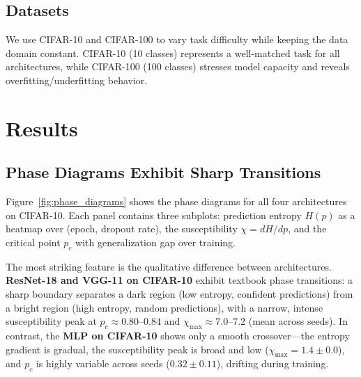 \documentclass{article}
\begin{document}
\subsection{Datasets}

We use CIFAR-10 and CIFAR-100 \citep{krizhevsky2009learning} to vary task difficulty while keeping the data domain constant. CIFAR-10 (10 classes) represents a well-matched task for all architectures, while CIFAR-100 (100 classes) stresses model capacity and reveals overfitting/underfitting behavior.

\section{Results}
\label{sec:results}

\subsection{Phase Diagrams Exhibit Sharp Transitions}

Figure~\ref{fig:phase_diagrams} shows the phase diagrams for all four architectures on CIFAR-10. Each panel contains three subplots: prediction entropy $H(p)$ as a heatmap over (epoch, dropout rate), the susceptibility $\chi = dH/dp$, and the critical point $p_c$ with generalization gap over training.

The most striking feature is the qualitative difference between architectures. \textbf{ResNet-18 and VGG-11 on CIFAR-10} exhibit textbook phase transitions: a sharp boundary separates a dark region (low entropy, confident predictions) from a bright region (high entropy, random predictions), with a narrow, intense susceptibility peak at $p_c \approx 0.80$--$0.84$ and $\chi_{\max} \approx 7.0$--$7.2$ (mean across seeds). In contrast, the \textbf{MLP on CIFAR-10} shows only a smooth crossover---the entropy gradient is gradual, the susceptibility peak is broad and low ($\chi_{\max} = 1.4 \pm 0.0$), and $p_c$ is highly variable across seeds ($0.32 \pm 0.11$), drifting during training.
\end{document}
